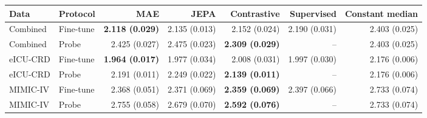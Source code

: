 \begin{tabular}{llrrrrr}
\toprule
Data & Protocol & MAE & JEPA & Contrastive & Supervised & Constant median \\
\midrule
Combined & Fine-tune & \textbf{2.118 (0.029)} & 2.135 (0.013) & 2.152 (0.024) & 2.190 (0.031) & 2.403 (0.025) \\
Combined & Probe & 2.425 (0.027) & 2.475 (0.023) & \textbf{2.309 (0.029)} & -- & 2.403 (0.025) \\
eICU-CRD & Fine-tune & \textbf{1.964 (0.017)} & 1.977 (0.034) & 2.008 (0.031) & 1.997 (0.030) & 2.176 (0.006) \\
eICU-CRD & Probe & 2.191 (0.011) & 2.249 (0.022) & \textbf{2.139 (0.011)} & -- & 2.176 (0.006) \\
MIMIC-IV & Fine-tune & 2.368 (0.051) & 2.371 (0.069) & \textbf{2.359 (0.069)} & 2.397 (0.066) & 2.733 (0.074) \\
MIMIC-IV & Probe & 2.755 (0.058) & 2.679 (0.070) & \textbf{2.592 (0.076)} & -- & 2.733 (0.074) \\
\bottomrule
\end{tabular}
